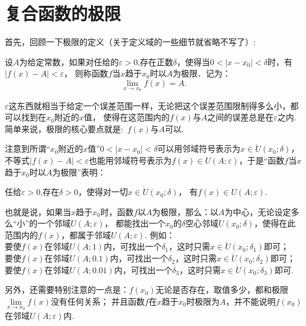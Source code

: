 \section{复合函数的极限}
首先，回顾一下极限的定义（关于定义域的一些细节就省略不写了）:
\begin{framed}
    设$A$为给定常数，如果对任给的$\varepsilon>0$,存在正数$\delta$，使得当$0<|x-x_0|<\delta$时，有$|f(x)-A|<\varepsilon$，
    则称{\fangsong 函数$f$当$x$趋于$x_0$时以$A$为极限}．记为：
    \[
        \lim_{x \to x_0} f(x)=A.
    \]
\end{framed}

$\varepsilon$这东西就相当于给定一个误差范围一样，无论把这个误差范围限制得多么小，都可以找到在$x_0$附近的$x$值，
使得在这范围内的$f(x)$与$A$之间的误差总是在$\varepsilon$之内.
简单来说，极限的核心要点就是:~$f(x)$与$A$可以.

注意到所谓“$x_0$附近的$x$值”$0<|x-x_0|<\delta$可以用邻域符号表示为$x\in\mathring{U}(x_0;\delta)$，
不等式$|f(x)-A|<\varepsilon$也能用邻域符号表示为$f(x)\in{U}(A;\varepsilon)$，于是“函数$f$当$x$趋于$x_0$时以$A$为极限”表明：
\begin{framed}
    任给$\varepsilon>0$,存在$\delta>0$，使得对一切$x\in\mathring{U}(x_0;\delta)$，
    有$f(x)\in{U}(A;\varepsilon)$. 
\end{framed}

也就是说，如果当$x$趋于$x_0$时，函数$f$以$A$为极限，那么：以$A$为中心，无论设定多么“小”的一个邻域${U}(A;\varepsilon)$，
都能找出一个$x_0$的$\delta$空心邻域$\mathring{U}(x_0;\delta)$，使得在此范围内的$f(x)$，都属于邻域${U}(A;\varepsilon)$.
例如：\\
要使$f(x)$在邻域${U}(A;1)$内，可找出一个$\delta_1$，这时只需$x\in\mathring{U}(x_0;\delta_1)$即可；\\
要使$f(x)$在邻域${U}(A;0.1)$内，可找出一个$\delta_2$，这时只需$x\in\mathring{U}(x_0;\delta_2)$即可；\\
要使$f(x)$在邻域${U}(A;0.01)$内，可找出一个$\delta_3$，这时只需$x\in\mathring{U}(x_0;\delta_3)$即可.

另外，还需要特别注意的一点是：$f(x_0)$无论是否存在，取值多少，都和极限$\lim\limits_{x \to x_0} f(x)$没有任何关系；
并且函数$f$在$x$趋于$x_0$时极限为$A$，并不能说明$f(x_0)$在邻域${U}(A;\varepsilon)$内.\\

